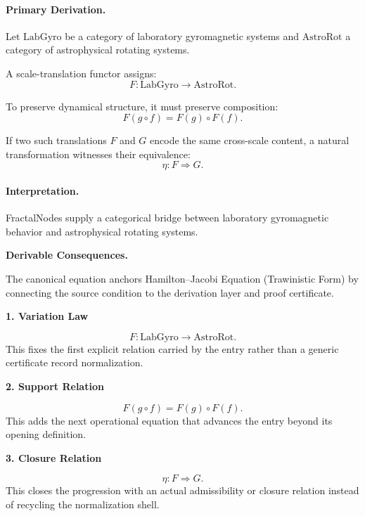 \paragraph{Primary Derivation.}
Let $\mathrm{LabGyro}$ be a category of laboratory gyromagnetic systems and $\mathrm{AstroRot}$ a category of astrophysical rotating systems.

A scale-translation functor assigns:
\begin{equation}
F:\mathrm{LabGyro}\to\mathrm{AstroRot}.
\end{equation}

To preserve dynamical structure, it must preserve composition:
\begin{equation}
F(g\circ f)=F(g)\circ F(f).
\end{equation}

If two such translations $F$ and $G$ encode the same cross-scale content, a natural transformation witnesses their equivalence:
\begin{equation}
\boxed{
\eta:F\Rightarrow G .
}
\end{equation}

\paragraph{Interpretation.}
FractalNodes supply a categorical bridge between laboratory gyromagnetic behavior and astrophysical rotating systems.

\par\vspace{0.35em}
\noindent\textbf{Derivable Consequences.}\quad
\begingroup
\footnotesize
\raggedright
The canonical equation anchors Hamilton--Jacobi Equation (Trawinistic Form) by connecting the source condition to the derivation layer and proof certificate.
\par\endgroup

\noindent\textbf{1. Variation Law}\par
\[
F:\mathrm{LabGyro}\longrightarrow\mathrm{AstroRot}.
\]
\noindent This fixes the first explicit relation carried by the entry rather than a generic certificate record normalization.\par
\noindent\textbf{2. Support Relation}\par
\[
F(g\circ f) = F(g)\circ F(f).
\]
\noindent This adds the next operational equation that advances the entry beyond its opening definition.\par
\noindent\textbf{3. Closure Relation}\par
\[
\eta:F\Rightarrow G.
\]
\noindent This closes the progression with an actual admissibility or closure relation instead of recycling the normalization shell.\par

